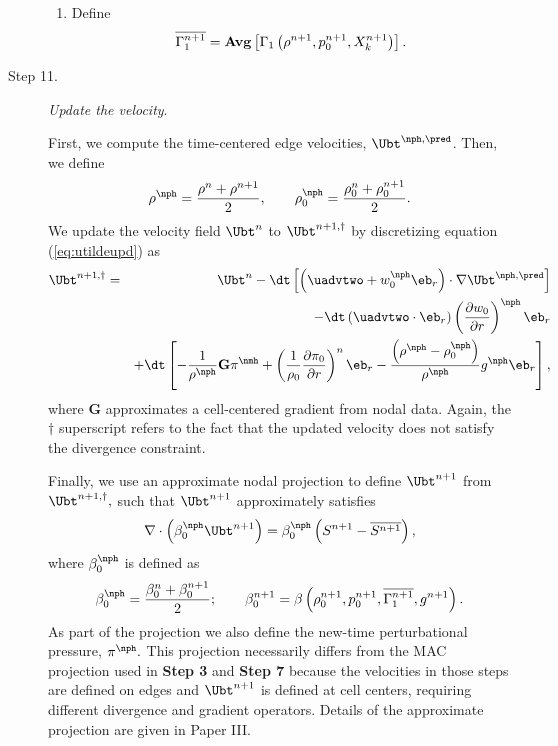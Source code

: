 \begin{description}
\begin{enumerate}
\item Define
\begin{equation}
\overline{\Gamma_1^{n+1}} = {\rm{\bf Avg}}\left[\Gamma_1\left(\rho^{n+1}, p_0^{n+1}, 
X_k^{n+1}\right) \right].
\end{equation}

\end{enumerate}


\item[Step 11.] {\em Update the velocity}.  

First, we compute the time-centered edge velocities, $\Ubt^{\nph,\pred}$.
Then, we define
\begin{equation}
\rho^\nph = \frac{\rho^n + \rho^{n+1}}{2}, \qquad \rho_0^\nph = \frac{\rho_0^n + \rho_0^{n+1}}{2}.
\end{equation}
We update the velocity field $\Ubt^n$ to $\Ubt^{n+1,\dagger}$ by discretizing 
equation (\ref{eq:utildeupd}) as
\begin{eqnarray}
\Ubt^{n+1,\dagger} 
&=& \Ubt^n - \dt \left[\left(\uadvtwo+ w_0^{\nph} \eb_r\right) \cdot \nabla \Ubt^{\nph,\pred} \right] \nonumber \\
&&- \dt \left(\uadvtwo \cdot \eb_r\right)  \left(\frac{\partial w_0}{\partial r} \right)^\nph \eb_r \nonumber \\
&& + \dt \left[ - \frac{1}{\rho^\nph} \mathbf{G} \pi^\nmh + \left(\frac{1}{\rho_0}\frac{\partial\pi_0}{\partial r}\right)^n \eb_r - \frac{\left(\rho^\nph-\rho_0^\nph\right)}{\rho^\nph} g^{\nph} \eb_r \right],\nonumber \\
\end{eqnarray}
where $\mathbf{G}$ approximates a cell-centered gradient from nodal
data.  Again, the $\dagger$ superscript refers 
to the fact that the updated velocity does not satisfy the divergence 
constraint.

Finally, we use an approximate nodal projection to define $\Ubt^{n+1}$
from $\Ubt^{n+1,\dagger},$  such that $\Ubt^{n+1}$ approximately
satisfies 
\begin{equation}
\nabla \cdot \left(\beta_0^{\nph} \Ubt^{n+1} \right) 
= \beta_0^{\nph} \left(S^{n+1} - \overline{S^{n+1}} \right),
\end{equation}
where $\beta_0^{\nph}$ is defined as
\begin{equation}
\beta_0^{\nph} = \frac{\beta_0^n + \beta_0^{n+1}}{2}; \qquad
\beta_0^{n+1} = \beta \left(\rho_0^{n+1}, p_0^{n+1}, \overline{\Gamma_1^{n+1}}, g^{n+1}\right).
\end{equation}
As part of the projection we also define the new-time perturbational pressure,
$\pi^\nph.$  This projection necessarily differs from the MAC projection used in 
{\bf Step 3} and {\bf Step 7} because the velocities in those steps are defined
on edges and $\Ubt^{n+1}$ is defined at cell centers, requiring different divergence
and gradient operators.  Details of the approximate projection are given in Paper III.


\end{description}
